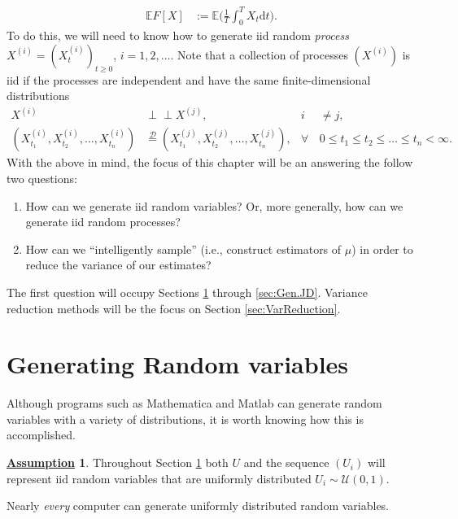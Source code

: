 \documentclass[12pt]{book}
\numberwithin{equation}{chapter}
\theoremstyle{plain}
\numberwithin{theorem}{section}
\theoremstyle{definition}
\newtheorem{assumption}[theorem]{\underline{Assumption}}
\numberwithin{exercise}{chapter}
\newcommand{\<}{\langle}
\renewcommand{\>}{\rangle}
\renewcommand{\(}{\left(}
\renewcommand{\)}{\right)}
\renewcommand{\[}{\left[}
\renewcommand{\]}{\right]}
\newcommand\Eb{\mathds{E}}
\newcommand\Dc{\mathscr{D}}
\newcommand\Uc{\mathscr{U}}
\newcommand{\ind}{\perp \! \! \! \perp}
\newcommand\dd{\mathrm{d}}
\begin{document}
\begin{align}
\Eb F[X]
	&:=	\Eb \Big( \frac{1}{T} \int_0^T X_t \dd t \Big) .
\end{align}
To do this, we will need to know how to generate iid random \emph{process} $X^{(i)} = (X_t^{(i)})_{t \geq 0}$, $i=1,2,\ldots$.  Note that a collection of processes $(X^{(i)})$ is iid if the processes are independent and have the same finite-dimensional distributions
\begin{align}
X^{(i)}
	&\ind X^{(j)} , &
i
	&\neq j , \\
(X_{t_1}^{(i)}, X_{t_2}^{(i)}, \ldots, X_{t_n}^{(i)})
	&\stackrel{\Dc}{=} (X_{t_1}^{(j)}, X_{t_2}^{(j)}, \ldots, X_{t_n}^{(j)}) , &
\forall \, 
	&0 \leq t_1 \leq t_2 \leq \ldots \leq t_n < \infty .
\end{align}
With the above in mind, the focus of this chapter will be an answering the follow two questions:
\begin{enumerate}
\item How can we generate iid random variables?  Or, more generally, how can we generate iid random processes?
\item  How can we ``intelligently sample'' (i.e., construct estimators of $\mu$) in order to reduce the variance of our estimates?
\end{enumerate}
The first question will occupy Sections \ref{sec:Gen.RVs} through \ref{sec:Gen.JD}.  Variance reduction methods will be the focus on Section \ref{sec:VarReduction}.

\section{Generating Random variables}
\label{sec:Gen.RVs}
Although programs such as Mathematica and Matlab can generate random variables with a variety of distributions, it is worth knowing how this is accomplished.
\begin{assumption}
Throughout Section \ref{sec:Gen.RVs} both $U$ and the sequence $(U_i)$ will represent iid random variables that are uniformly distributed $U_i \sim \Uc(0,1)$.
\end{assumption}
\noindent
Nearly \emph{every} computer can generate uniformly distributed random variables.
\end{document}
